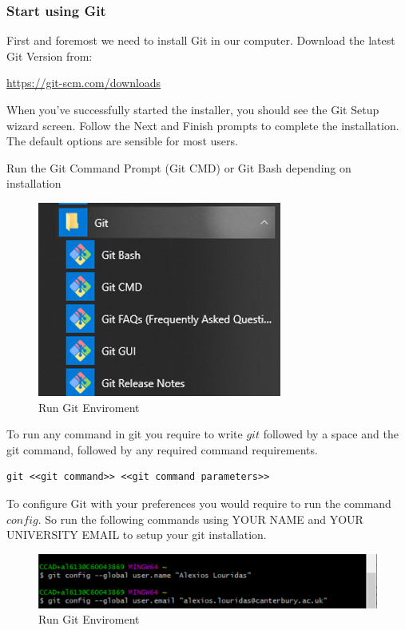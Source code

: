 \documentclass[
]{book}
\begin{document}
\hypertarget{start-using-git}{%
\subsubsection{Start using Git}\label{start-using-git}}

First and foremost we need to install Git in our computer. Download the latest Git Version from:

\url{https://git-scm.com/downloads}

When you've successfully started the installer, you should see the Git Setup wizard screen. Follow the Next and Finish prompts to complete the installation. The default options are sensible for most users.

Run the Git Command Prompt (Git CMD) or Git Bash depending on installation

\begin{figure}

{\centering \includegraphics[width=0.6\linewidth]{images/Git folder} 

}

\caption{Run Git Enviroment}\label{fig:unnamed-chunk-4}
\end{figure}

To run any command in git you require to write \(git\) followed by a space and the git command, followed by any required command requirements.

\begin{verbatim}
git <<git command>> <<git command parameters>>
\end{verbatim}

To configure Git with your preferences you would require to run the command \(config\). So run the following commands using YOUR NAME and YOUR UNIVERSITY EMAIL to setup your git installation.

\begin{figure}

{\centering \includegraphics[width=0.8\linewidth]{images/Git init} 

}

\caption{Run Git Enviroment}\label{fig:unnamed-chunk-5}
\end{figure}
\end{document}
